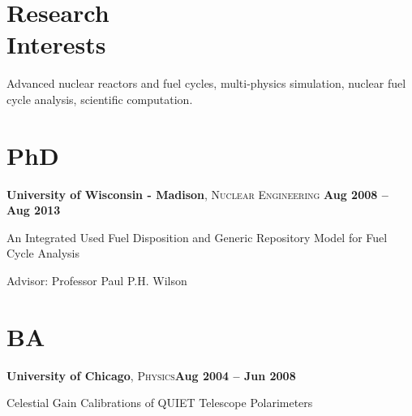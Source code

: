\documentclass[margin,line]{resume}
\begin{document}
\begin{resume}
    \section{\mysidestyle Research\\Interests}
                Advanced nuclear reactors and fuel cycles, multi-physics
                simulation, nuclear fuel cycle analysis,
                scientific computation.
    \section{\mysidestyle PhD}
    \textbf{University of Wisconsin - Madison}, \textsc{Nuclear Engineering}\hfill \textbf{ Aug 2008 -- Aug 2013}\vspace{-3mm}\\\vspace{-1mm}%
    \begin{list2}
        \item An Integrated Used Fuel Disposition and Generic Repository Model for Fuel Cycle Analysis
        \item Advisor:  Professor Paul P.H. Wilson
    \end{list2}\vspace{-1.5mm}
    \section{\mysidestyle BA}
    \textbf{University of Chicago}, \textsc{Physics}\hfill\textbf{Aug 2004 -- Jun 2008}\vspace{-3mm}\\\vspace{-1mm}%
    \begin{list2}
        \item Celestial Gain Calibrations of QUIET Telescope Polarimeters
    \end{list2}\vspace{-1.5mm}

\end{resume}
\end{document}
